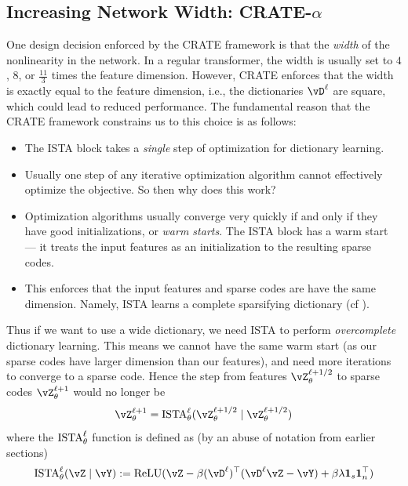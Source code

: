 \documentclass[../../book-main.tex]{subfiles}
\begin{document}
\subsection{Increasing Network Width: CRATE-\(\alpha\)}\label{sub:crate_alpha_experiments}

One design decision enforced by the CRATE framework is that the \textit{width} of the nonlinearity in the network. In a regular transformer, the width is usually set to \(4\), \(8\), or \(\frac{11}{3}\) times the feature dimension. However, CRATE enforces that the width is exactly equal to the feature dimension, i.e., the dictionaries \(\vD^{\ell}\) are square, which could lead to reduced performance. The fundamental reason that the CRATE framework constrains us to this choice is as follows:
\begin{itemize}
    \item The ISTA block takes a \textit{single} step of optimization for dictionary learning.
    \item Usually one step of any iterative optimization algorithm cannot effectively optimize the objective. So then why does this work?
    \item Optimization algorithms usually converge very quickly if and only if they have good initializations, or \textit{warm starts}. The ISTA block has a warm start --- it treats the input features as an initialization to the resulting sparse codes.
    \item This enforces that the input features and sparse codes are have the same dimension. Namely, ISTA learns a complete sparsifying dictionary (cf ).
\end{itemize}
Thus if we want to use a wide dictionary, we need ISTA to perform \textit{overcomplete} dictionary learning. This means we cannot have the same warm start (as our sparse codes have larger dimension than our features), and need more iterations to converge to a sparse code. Hence the step from features \(\vZ_{\theta}^{\ell + 1/2}\) to sparse codes \(\vZ_{\theta}^{\ell + 1}\) would no longer be 
\begin{equation}
    \vZ_{\theta}^{\ell + 1} = \ISTA_{\theta}^{\ell}(\vZ_{\theta}^{\ell + 1/2} \mid \vZ_{\theta}^{\ell + 1/2})
\end{equation}
where the \(\operatorname{ISTA}_{\theta}^{\ell}\) function is defined as (by an abuse of notation from earlier sections)
\begin{equation}
    \ISTA_{\theta}^{\ell}(\vZ \mid \vY) := \ReLU(\vZ - \beta (\vD^{\ell})^{\top}(\vD^{\ell}\vZ - \vY) + \beta \lambda \vone_{s}\vone_{n}^{\top})
\end{equation}
\end{document}
